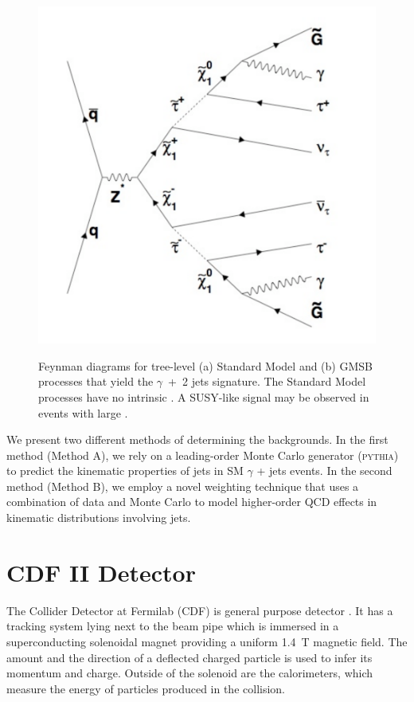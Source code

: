 \documentclass[12pt,twoside,letterpaper,doublespace]{article}
\begin{document}
\begin{figure}[b!]
{\includegraphics[scale=0.28]{gmsb_2.pdf}}
\caption{Feynman diagrams for tree-level (a) Standard Model and (b) GMSB processes that yield the $\gamma$~+~2 jets signature. The Standard Model processes have no intrinsic \met. A SUSY-like signal may be observed in \phojets events with large \met.}
\end{figure}

We present two different methods of determining the backgrounds.  In the first method (Method A), we rely on a leading-order Monte Carlo generator (\textsc{pythia}) to predict the kinematic properties of jets in SM $\gamma$ + jets events.  In the second method (Method B), we employ a novel weighting technique that uses a combination of data and Monte Carlo to model higher-order QCD effects in kinematic distributions involving jets.

\section{CDF II Detector}
The Collider Detector at Fermilab (CDF) is  general purpose detector \cite{ref:CDFDetector}. It has a tracking system lying next to the beam pipe which is immersed in a superconducting solenoidal magnet providing a uniform 1.4~T magnetic field. The amount and the direction of a deflected charged particle is used to infer its momentum and charge. Outside of the solenoid are the calorimeters, which measure the energy of particles produced in the collision.
\end{document}
